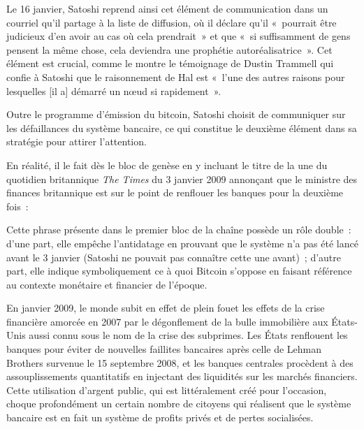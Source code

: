 Le 16 janvier, Satoshi reprend ainsi cet élément de communication dans un courriel qu'il partage à la liste de diffusion, où il déclare qu'il «~pourrait être judicieux d'en avoir au cas où cela prendrait~» et que «~si suffisamment de gens pensent la même chose, cela deviendra une prophétie autoréalisatrice~». Cet élément est crucial, comme le montre le témoignage de Dustin Trammell qui confie à Satoshi que le raisonnement de Hal est «~l'une des autres raisons pour lesquelles [il a] démarré un nœud si rapidement~».



Outre le programme d'émission du bitcoin, Satoshi choisit de communiquer sur les défaillances du système bancaire, ce qui constitue le deuxième élément dans sa stratégie pour attirer l'attention.

En réalité, il le fait dès le bloc de genèse en y incluant le titre de la une du quotidien britannique \emph{The Times} du 3 janvier 2009 annonçant que le ministre des finances britannique est sur le point de renflouer les banques pour la deuxième fois~:

\begin{quote}
\end{quote}

Cette phrase présente dans le premier bloc de la chaîne possède un rôle double~: d'une part, elle empêche l'antidatage en prouvant que le système n'a pas été lancé avant le 3 janvier (Satoshi ne pouvait pas connaître cette une avant)~; d'autre part, elle indique symboliquement ce à quoi Bitcoin s'oppose en faisant référence au contexte monétaire et financier de l'époque.

En janvier 2009, le monde subit en effet de plein fouet les effets de la crise financière amorcée en 2007 par le dégonflement de la bulle immobilière aux États-Unis aussi connu sous le nom de la crise des subprimes. Les États renflouent les banques pour éviter de nouvelles faillites bancaires après celle de Lehman Brothers survenue le 15 septembre 2008, et les banques centrales procèdent à des assouplissements quantitatifs en injectant des liquidités sur les marchés financiers. Cette utilisation d'argent public, qui est littéralement créé pour l'occasion, choque profondément un certain nombre de citoyens qui réalisent que le système bancaire est en fait un système de profits privés et de pertes socialisées.

